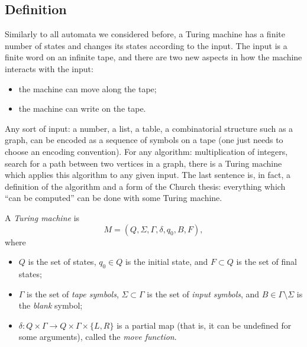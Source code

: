 \begin{page}
\setcounter{section}{8}
\setcounter{subsection}{1}
\setcounter{dfn}{0}
\label{portion:1178}

\subsection{Definition}
Similarly to all automata we considered before,
a Turing machine has a finite number of states and changes its states according to the input.
The input is a finite word on an infinite tape, and there are two new aspects in how the machine interacts with the input:
\begin{itemize}
\item
the machine can move along the tape;
\item
the machine can write on the tape.
\end{itemize}

Any sort of input: a number, a list, a table, a combinatorial structure such as a graph,
can be encoded as a sequence of symbols on a tape (one just needs to choose an encoding convention).
For any algorithm: multiplication of integers, search for a path between two vertices in a graph,
there is a Turing machine which applies this algorithm to any given input.
The last sentence is, in fact, a definition of the algorithm and a form of the Church thesis:
everything which ``can be computed'' can be done with some Turing machine.


\end{page}

\begin{page}
\setcounter{section}{8}
\setcounter{subsection}{1}
\setcounter{dfn}{1}
\label{portion:1180}

\begin{dfn}
A \emph{Turing machine} is
\[
M = (Q, \Sigma, \Gamma, \delta, q_0, B, F),
\]
where
\begin{itemize}
\item
$Q$ is the set of states, $q_0 \in Q$ is the initial state, and $F \subset Q$ is the set of final states;
\item
$\Gamma$ is the set of \emph{tape symbols}, $\Sigma \subset \Gamma$ is the set of \emph{input symbols},
and $B \in \Gamma \setminus \Sigma$ is the \emph{blank} symbol;
\item
$\delta \colon Q \times \Gamma \to Q \times \Gamma \times \{L, R\}$
is a partial map (that is, it can be undefined for some arguments), called the \emph{move function}.
\end{itemize}
\end{dfn}

\end{page}

